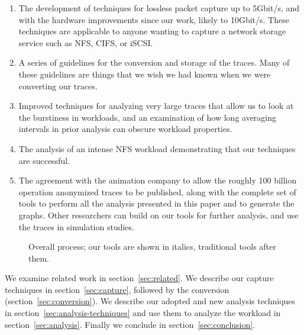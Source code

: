 \begin{enumerate}
\item The development of techniques for lossless packet capture up to
5Gbit/s, and with the hardware improvements since our work, likely to
10Gbit/s.  These techniques are applicable to anyone wanting to capture
a network storage service such as NFS, CIFS, or iSCSI.

\item A series of guidelines for the conversion and storage of the traces.
Many of these guidelines are things that we wish we had known when we
were converting our traces.

\item Improved techniques for analyzing very large traces that allow
us to look at the burstiness in workloads, and an examination of how
long averaging intervals in prior analysis can obscure workload
properties.

\item The analysis of an intense NFS workload demonstrating that our
techniques are successful.

\item The agreement with the animation company to allow the roughly
100 billion operation anonymized traces to be published, along with
the complete set of tools to perform all the analysis presented in
this paper and to generate the graphs.  Other
researchers can build on our tools for further analysis, and use
the traces in simulation studies.
\end{enumerate}

\begin{figure}
\center {}
\caption{Overall process; our tools are shown in italics, traditional tools
after them.}
\label{fig:overall-process}
\end{figure}

We examine related work in section~\ref{sec:related}.  We describe our
capture techniques in section~\ref{sec:capture}, followed by the
conversion (section~\ref{sec:conversion}). We describe our adopted and
new analysis techniques in section~\ref{sec:analysis-techniques} and
use them to analyze the workload in section~\ref{sec:analysis}.
Finally we conclude in section~\ref{sec:conclusion}.
